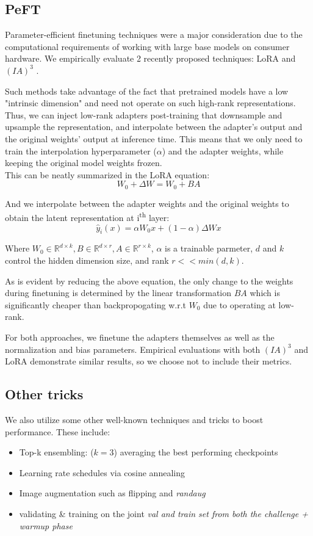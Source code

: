 \documentclass[conference]{IEEEtran}
\begin{document}
\subsection{PeFT}

Parameter-efficient finetuning techniques were a major consideration due to the computational requirements of working with large base models on consumer hardware. We empirically evaluate 2 recently proposed techniques: LoRA \cite{b18} and $(IA)^3$ \cite{b19}. 

Such methods take advantage of the fact that pretrained models have a low "intrinsic dimension" \cite{b18} and need not operate on such high-rank representations. Thus, we can inject low-rank adapters post-training that downsample and upsample the representation, and interpolate between the adapter's output and the original weights' output at inference time. This means that we only need to train the interpolation hyperparameter ($\alpha$) and the adapter weights, while keeping the original model weights frozen.\\

This can be neatly summarized in the LoRA equation:
$$
    W_0 + \Delta W = W_0 + BA
$$

And we interpolate between the adapter weights and the original weights to obtain the latent representation at i\textsuperscript{th} layer:
$$
    \hat{y}_i(x) = \alpha W_0 x + (1 - \alpha) \Delta W x
$$

Where $W_0 \in \mathbb{R}^{d \times k}, B \in \mathbb{R}^{d \times r}, A \in \mathbb{R}^{r \times k}$, $\alpha$ is a trainable parmeter, $d$ and $k$ control the hidden dimension size, and rank $r << min(d, k)$.
\vspace{3.25pt}

As is evident by reducing the above equation, the only change to the weights during finetuning is determined by the linear transformation $BA$ which is significantly cheaper than backpropogating w.r.t $W_0$ due to operating at low-rank.
\vspace{3.25pt}

For both approaches, we finetune the adapters themselves as well as the normalization and bias parameters. Empirical evaluations with both $(IA)^3$ and LoRA demonstrate similar results, so we choose not to include their metrics.

\subsection{Other tricks}
We also utilize some other well-known techniques and tricks to boost performance. These include:
\\
\begin{itemize}
    \item Top-k ensembling: ($k=3$) averaging the best performing checkpoints 
    \item Learning rate schedules via cosine annealing
    \item Image augmentation such as flipping and \textit{randaug}\cite{b20}
    \item  validating \& training on the joint \em{val} and \em{train} set from both the challenge + warmup phase
\end{itemize}
\end{document}
